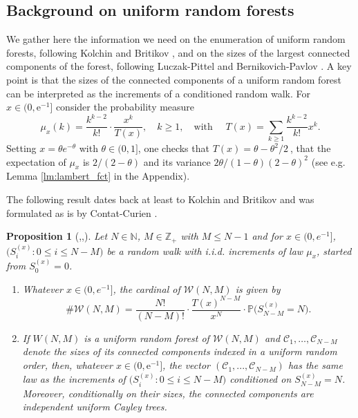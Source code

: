 \documentclass[a4, 11pt]{article}
\numberwithin{equation}{section}
\theoremstyle{plain}
\newtheorem{proposition}[theorem]{Proposition}
\theoremstyle{definition}
\theoremstyle{remark}
\begin{document}
\subsection{Background on uniform random forests}
\label{sec:URF}

We gather here the information we need on the enumeration of uniform random forests, following Kolchin  \cite{kolchin86} and Britikov \cite{britikov88}, and on the sizes of the largest connected components of the forest, following Luczak-Pittel \cite{LuczakPittel92} and Bernikovich-Pavlov \cite{BernikovichPavlov11}. A key point is that the sizes of the connected components of a uniform random forest can be interpreted as the increments of a conditioned random walk. For $x\in (0,\mathrm{e}^{-1}]$ consider the probability measure
\begin{equation}\label{def:mu_x}
\mu_x(k)=\frac{k^{k-2}}{k!} \cdot \frac{x^k}{T(x)},\quad k\geq 1, \quad \text{with } \quad T(x)=\sum_{k\geq 1}\frac{k^{k-2}}{k!}x^k.
\end{equation}
Setting $x=\theta e^{-\theta}$ with $\theta \in (0,1]$, one checks that $T(x)=\theta-\theta^2/2~$, that the expectation of $\mu_x$ is  $2/(2-\theta)$ and its variance $2\theta/(1-\theta)(2-\theta)^2$ (see e.g. Lemma \ref{lm:lambert_fct} in the Appendix).

The following result dates back at least to Kolchin  \cite{kolchin86} and Britikov \cite{britikov88} and was formulated as is by Contat-Curien \cite{ContatCurien23}.

\begin{proposition}[\cite{kolchin86},\cite{britikov88},\cite{ContatCurien23}]
\label{prop_forest_rw}
Let $N \in \mathbb N$, $M \in \mathbb Z_+$ with $M\leq N-1$ and for $x\in (0,e^{-1}]$, \linebreak $\big(S_i^{(x)}:0\leq i\leq N-M\big)$ be a random walk with i.i.d. increments of law $\mu_x$, started from $S_0^{(x)}=0$.
\begin{enumerate}[topsep=0cm]
\item[\emph{1)}] Whatever $x\in (0,e^{-1}]$, the cardinal of $\mathcal W(N,M)$ is given by
	$$\#\mathcal{W}(N,M)=\frac{N!}{(N-M)!} \cdot \frac{T(x)^{N-M}}{x^N} \cdot \mathbb{P}\big(S_{N-M}^{(x)}=N\big).$$
\item[\emph{2)}] If $W(N,M)$ is a uniform random forest of $\mathcal W(N,M)$ and $\mathcal{C}_1,\ldots,\mathcal{C}_{N-M}$ denote the sizes of its connected components indexed in a uniform random order, then, whatever $x\in (0,\mathrm{e}^{-1}]$, the vector $\left(\mathcal{C}_1,...,\mathcal{C}_{N-M}\right)$ has the same law as the increments of $\big(S_i^{(x)}:0\leq i\leq N-M\big)$ conditioned on $S_{N-M}^{(x)}=N$. Moreover, conditionally on their sizes, the connected components are independent uniform Cayley trees.
\end{enumerate}
\end{proposition}
\end{document}
